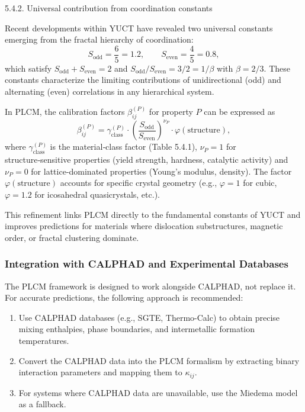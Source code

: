 \documentclass[12pt,a4paper]{article}
\begin{document}
	5.4.2. Universal contribution from coordination constants
	
	Recent developments within YUCT have revealed two universal constants emerging from the fractal hierarchy of coordination:
	\[
	S_{\text{odd}} = \frac{6}{5}=1.2,\qquad S_{\text{even}} = \frac{4}{5}=0.8,
	\]
	which satisfy \(S_{\text{odd}}+S_{\text{even}}=2\) and \(S_{\text{odd}}/S_{\text{even}} = 3/2 = 1/\beta\) with \(\beta=2/3\).
	These constants characterize the limiting contributions of unidirectional (odd) and alternating (even) correlations in any hierarchical system.
	
	In PLCM, the calibration factors \(\beta_{ij}^{(P)}\) for property \(P\) can be expressed as
	\[
	\beta_{ij}^{(P)} = \gamma_{\text{class}}^{(P)} \cdot \left( \frac{S_{\text{odd}}}{S_{\text{even}}} \right)^{\nu_P} \cdot \varphi(\text{structure}),
	\]
	where \(\gamma_{\text{class}}^{(P)}\) is the material‑class factor (Table 5.4.1), \(\nu_P = 1\) for structure‑sensitive properties (yield strength, hardness, catalytic activity) and \(\nu_P = 0\) for lattice‑dominated properties (Young's modulus, density). The factor \(\varphi(\text{structure})\) accounts for specific crystal geometry (e.g., \(\varphi=1\) for cubic, \(\varphi=1.2\) for icosahedral quasicrystals, etc.).
	
	This refinement links PLCM directly to the fundamental constants of YUCT and improves predictions for materials where dislocation substructures, magnetic order, or fractal clustering dominate.
	
	\subsubsection{Integration with CALPHAD and Experimental Databases}
	
	The PLCM framework is designed to work alongside CALPHAD, not replace it. For accurate predictions, the following approach is recommended:
	
	\begin{enumerate}
		\item Use CALPHAD databases (e.g., SGTE, Thermo-Calc) to obtain precise mixing enthalpies, phase boundaries, and intermetallic formation temperatures.
		\item Convert the CALPHAD data into the PLCM formalism by extracting binary interaction parameters and mapping them to \(\kappa_{ij}\).
		\item For systems where CALPHAD data are unavailable, use the Miedema model as a fallback.
	\end{enumerate}
	
\end{document}
